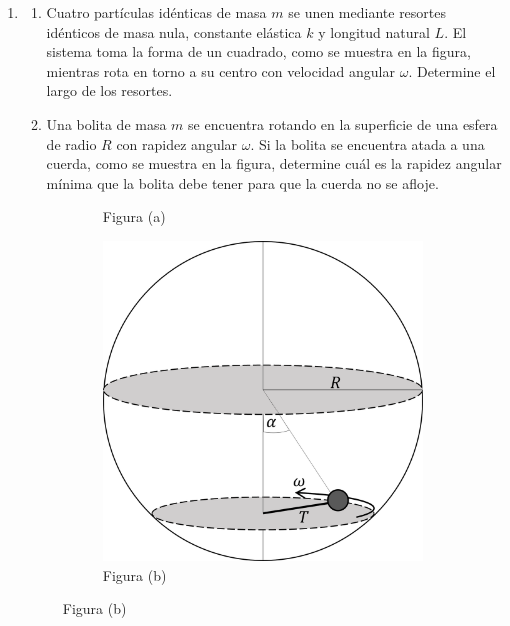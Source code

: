 \documentclass[letterpaper,11pt]{article}
\begin{document}
\begin{enumerate}\setlength{\itemsep}{0.4cm}

\item 
\begin{enumerate}
    \item Cuatro partículas idénticas de masa $m$ se unen mediante resortes idénticos de masa nula, constante elástica $k$ y longitud natural $L$. El sistema toma la forma de un cuadrado, como se muestra en la figura, mientras rota en torno a su centro con velocidad angular $\omega$. Determine el largo de los resortes.

    \item Una bolita de masa $m$ se encuentra rotando en la superficie de una esfera de radio $R$ con rapidez angular $\omega$. Si la bolita se encuentra atada a una cuerda, como se muestra en la figura, determine cuál es la rapidez angular mínima que la bolita debe tener para que la cuerda no se afloje.
\end{enumerate}

\begin{figure}[H]
    \centering
    \begin{subfigure}[t]{0.2\textwidth}
        \centering
        
        \caption*{Figura (a)}
    \end{subfigure}
    \hspace{8em}
    \begin{subfigure}[t]{0.18\textwidth}
        \centering
        \includegraphics[width=1\linewidth]{2023-1/img/aux_5/esfera.png}
        \caption*{Figura (b)}
    \end{subfigure}
\end{figure}


\end{enumerate}
\end{document}
